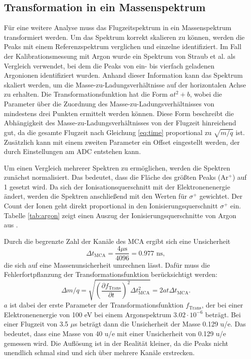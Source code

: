 \subsection{Transformation in ein Massenspektrum}
Für eine weitere Analyse muss das Flugzeitspektrum in ein Massenspektrum transformiert werden. Um das Spektrum korrekt skalieren zu können, werden die Peaks mit einem Referenzspektrum verglichen und einzelne identifiziert. Im Fall der Kalibrationsmessung mit Argon wurde ein Spektrum von Straub et al. \cite{Straub} als Vergleich verwendet, bei dem die Peaks von ein- bis vierfach geladenen Argonionen identifiziert wurden. Anhand dieser Information kann das Spektrum skaliert werden, um die Masse-zu-Ladungsverhältnisse auf der horizontalen Achse zu erhalten. Die Transformationsfunktion hat die Form $at^2+b$, wobei die Parameter über die Zuordnung des Masse-zu-Ladungsverhältnisses von mindestens drei Punkten ermittelt werden können. Diese Form beschreibt die Abhängigkeit des Masse-zu-Ladungsverhältnisses von der Flugzeit hinreichend gut, da die gesamte Flugzeit nach Gleichung \ref{eq:time} proportional zu $\sqrt{m/q}$ ist. Zusätzlich kann mit einem zweiten Parameter ein Offset eingestellt werden, der durch Einstellungen am ADC entstehen kann. 

Um einen Vergleich mehrerer Spektren zu ermöglichen, werden die Spektren zunächst normalisiert. Das bedeutet, dass die Fläche des größten Peaks (Ar$^+$) auf 1 gesetzt wird. Da sich der Ionisationsquerschnitt mit der Elektronenenergie ändert, werden die Spektren anschließend mit den Werten für $\sigma^+$ gewichtet. Der Count der Ionen geht direkt proportional in den Ionisierungsquerschnitt $\sigma^+$ ein. Tabelle \ref{tab:argon} zeigt einen Auszug der Ionisierungsquerschnitte von Argon aus \cite{Straub}.

Durch die begrenzte Zahl der Kanäle des MCA ergibt sich eine Unsicherheit 
\begin{equation}
    \Delta t_{\mathrm{MCA}} = \frac{4 \text{$\mu$s}}{4096} = 0.977 \text{ ns},
\end{equation} 
die sich auf eine Massenunsicherheit umrechnen lässt. Dafür muss die Fehlerfortpflanzung der Transformationsfunktion berücksichtigt werden:
\begin{equation}
    \Delta m/q = \sqrt{\left(\frac{\partial f_\mathrm{Trans}}{\partial t}\right)^2 \Delta t_{\mathrm{MCA}}^2} = 2at\Delta t_{\mathrm{MCA}}.
\end{equation}
$a$ ist dabei der erste Parameter der Transformationsfunktion $f_\mathrm{Trans}$, der bei einer Elektronenenergie von 100 eV bei einem Argonspektrum $3.02 \cdot 10^{-6}$ beträgt. Bei einer Flugzeit von 3.5 $\mu$s beträgt dann die Unsicherheit der Masse 0.129 u/e. Das bedeutet, dass eine Masse von 40 u/e mit einer Unsicherheit von 0.129 u/e gemessen wird. Die Auflösung ist in der Realität kleiner, da die Peaks nicht unendlich schmal sind und sich über mehrere Kanäle erstrecken.

